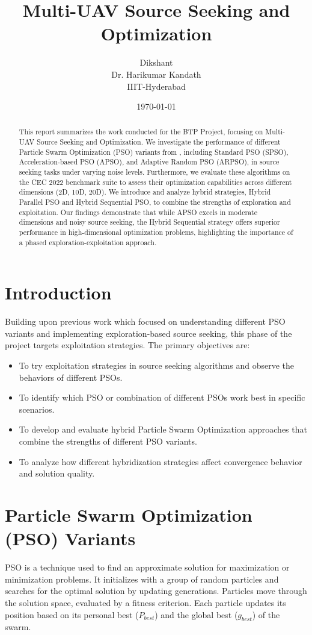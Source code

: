 \documentclass[a4paper,12pt]{article}
\title{Multi-UAV Source Seeking and Optimization}
\author{Dikshant \\ Dr. Harikumar Kandath \\ IIIT-Hyderabad}
\date{\today}
\begin{document}
\maketitle

\begin{abstract}
This report summarizes the work conducted for the BTP Project, focusing on Multi-UAV Source Seeking and Optimization. We investigate the performance of different Particle Swarm Optimization (PSO) variants from \cite{10312321}, including Standard PSO (SPSO), Acceleration-based PSO (APSO), and Adaptive Random PSO (ARPSO), in source seeking tasks under varying noise levels. Furthermore, we evaluate these algorithms on the CEC 2022 benchmark suite to assess their optimization capabilities across different dimensions (2D, 10D, 20D). We introduce and analyze hybrid strategies, Hybrid Parallel PSO and Hybrid Sequential PSO, to combine the strengths of exploration and exploitation. Our findings demonstrate that while APSO excels in moderate dimensions and noisy source seeking, the Hybrid Sequential strategy offers superior performance in high-dimensional optimization problems, highlighting the importance of a phased exploration-exploitation approach.
\end{abstract}

\section{Introduction}
Building upon previous work which focused on understanding different PSO variants and implementing exploration-based source seeking, this phase of the project targets exploitation strategies. The primary objectives are:
\begin{itemize}
    \item To try exploitation strategies in source seeking algorithms and observe the behaviors of different PSOs.
    \item To identify which PSO or combination of different PSOs work best in specific scenarios.
    \item To develop and evaluate hybrid Particle Swarm Optimization approaches that combine the strengths of different PSO variants.
    \item To analyze how different hybridization strategies affect convergence behavior and solution quality.
\end{itemize}

\section{Particle Swarm Optimization (PSO) Variants}
PSO is a technique used to find an approximate solution for maximization or minimization problems. It initializes with a group of random particles and searches for the optimal solution by updating generations. Particles move through the solution space, evaluated by a fitness criterion. Each particle updates its position based on its personal best ($P_{best}$) and the global best ($g_{best}$) of the swarm.
\end{document}
